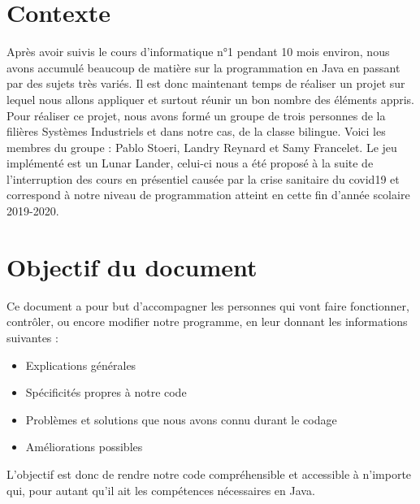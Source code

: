 \section{Contexte}
Après avoir suivis le cours d’informatique n°1 pendant 10 mois environ, nous avons accumulé beaucoup de matière sur la programmation en Java en passant par des sujets très variés. Il est donc maintenant temps de réaliser un projet sur lequel nous allons appliquer et surtout réunir un bon nombre des éléments appris.
Pour réaliser ce projet, nous avons formé un groupe de trois personnes de la filières Systèmes Industriels et dans notre cas, de la classe bilingue. Voici les membres du groupe : Pablo Stoeri, Landry Reynard et Samy Francelet.
Le jeu implémenté est un Lunar Lander, celui-ci nous a été proposé à la suite de l’interruption des cours en présentiel causée par la crise sanitaire du covid19 et correspond à notre niveau de programmation atteint en cette fin d’année scolaire 2019-2020.

\section{Objectif du document}
Ce document a pour but d’accompagner les personnes qui vont faire fonctionner, contrôler, ou encore modifier notre programme, en leur donnant les informations suivantes :
\begin{itemize}
\item	Explications générales
\item	Spécificités propres à notre code
\item	Problèmes et solutions que nous avons connu durant le codage
\item	Améliorations possibles
\end{itemize}
L’objectif est donc de rendre notre code compréhensible et accessible à n’importe qui, pour autant qu’il ait les compétences nécessaires en Java.


